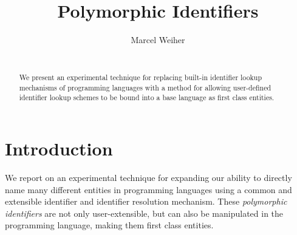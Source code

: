 \documentclass[preprint,authoryear]{acm_proc_article-sp}
\begin{document}



\title{Polymorphic Identifiers}

\author{
\alignauthor Marcel Weiher\\
       \\
}

\maketitle

\begin{abstract}
We present an experimental technique for replacing built-in identifier lookup mechanisms
of programming languages with a method for allowing user-defined identifier lookup schemes
to be bound into a base language as first class entities.  


\end{abstract}


\setlength{\epigraphrule}{0pt}


\section{Introduction}

We report on an experimental
technique for expanding our ability to directly name many different 
entities
in programming languages using a common and extensible identifier and identifier resolution
mechanism.
These \emph{polymorphic identifiers} are not only user-extensible,
but can also be manipulated in the programming language, making them first class 
entities.
\end{document}
